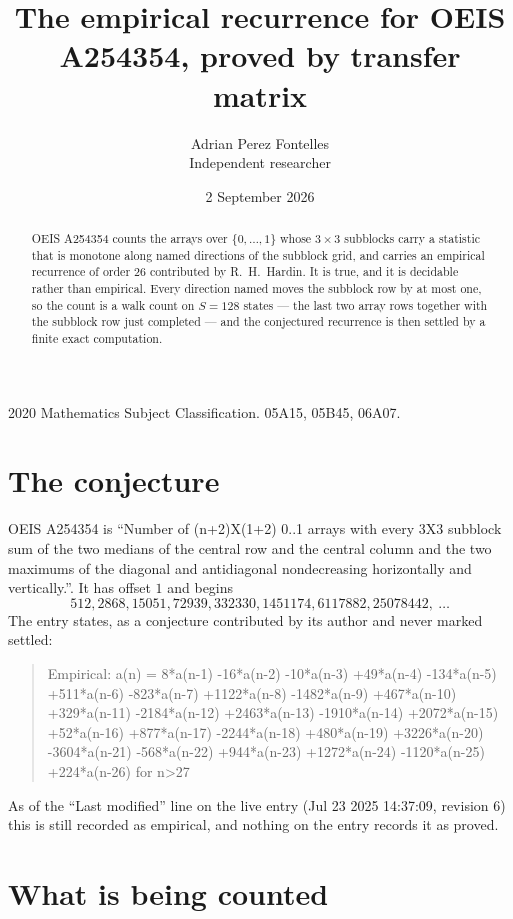 \documentclass[11pt,a4paper]{article}
\title{The empirical recurrence for OEIS A254354, proved by transfer matrix}
\author{Adrian Perez Fontelles\\ \small Independent researcher}
\date{2 September 2026}
\theoremstyle{plain}
\theoremstyle{definition}
\begin{document}
\maketitle

\begin{abstract}
OEIS A254354 counts the arrays over $\{0,\dots,1\}$ whose $3\times3$ subblocks carry a
statistic that is monotone along named directions of the subblock grid, and carries an
empirical recurrence of order $26$ contributed by R.~H.~Hardin. It is true, and it is
decidable rather than empirical. Every direction named moves the subblock row by at most one,
so the count is a walk count on $S=128$ states --- the last two array rows together with the
subblock row just completed --- and the conjectured recurrence is then settled by a finite
exact computation.
\end{abstract}

\noindent\small 2020 Mathematics Subject Classification. 05A15, 05B45, 06A07.\normalsize

\section{The conjecture}

OEIS A254354 is ``Number of (n+2)X(1+2) 0..1 arrays with every 3X3 subblock sum of the two medians of the central row and the central column and the two maximums of the diagonal and antidiagonal nondecreasing horizontally and vertically.''. It has offset $1$ and begins
\[
512, 2868, 15051, 72939, 332330, 1451174, 6117882, 25078442,\ \dots
\]
The entry states, as a conjecture contributed by its author and never marked settled:
\begin{quote}
Empirical: a(n) = 8*a(n-1) -16*a(n-2) -10*a(n-3) +49*a(n-4) -134*a(n-5) +511*a(n-6) -823*a(n-7) +1122*a(n-8) -1482*a(n-9) +467*a(n-10) +329*a(n-11) -2184*a(n-12) +2463*a(n-13) -1910*a(n-14) +2072*a(n-15) +52*a(n-16) +877*a(n-17) -2244*a(n-18) +480*a(n-19) +3226*a(n-20) -3604*a(n-21) -568*a(n-22) +944*a(n-23) +1272*a(n-24) -1120*a(n-25) +224*a(n-26) for n>27
\end{quote}
As of the ``Last modified'' line on the live entry (Jul 23 2025 14:37:09, revision 6) this is still
recorded as empirical, and nothing on the entry records it as proved.

\section{What is being counted}
\end{document}
